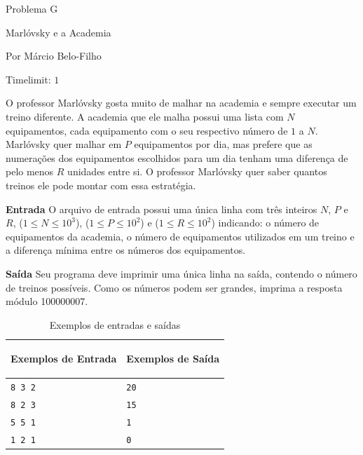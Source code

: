 \begin{center}
Problema G

Marlóvsky e a Academia

{\tiny Por Márcio Belo-Filho}

Timelimit: $1$	
\end{center}			
			
O professor Marlóvsky gosta muito de malhar na academia e sempre executar um treino diferente. A academia que ele malha possui uma lista com $N$ equipamentos, cada equipamento com o seu respectivo número de $1$ a $N$. Marlóvsky quer malhar em $P$ equipamentos por dia, mas prefere que as numerações dos equipamentos escolhidos para um dia tenham uma diferença de pelo menos $R$ unidades entre si. O professor Marlóvsky quer saber quantos treinos ele pode montar com essa estratégia. 

\vspace{0.3cm}
\textbf{Entrada}
O arquivo de entrada possui uma única linha com três inteiros $N$, $P$ e $R$, ($1 \leq N \leq 10^{3}$), ($1 \leq P \leq 10^{2}$) e ($1 \leq R \leq 10^{2}$) indicando: o número de equipamentos da academia, o número de equipamentos utilizados em um treino e a diferença mínima entre os números dos equipamentos. 

\vspace{0.3cm}
\textbf{Saída}
Seu programa deve imprimir uma única linha na saída, contendo o número de treinos possíveis. Como os números podem ser grandes, imprima a resposta módulo 100000007.

\begin{table}[h]
    \centering
    \begin{tabular}{|p{7cm}|p{7cm}|}
        \hline
        \begin{center}
            \vspace{-0.3cm}
            \textbf{Exemplos de Entrada}
            \vspace{-0.3cm}
        \end{center} 
         &  
        \begin{center}
            \vspace{-0.3cm}
            \textbf{Exemplos de Saída}
            \vspace{-0.3cm}
        \end{center} \\ \hline
         \texttt{8 3 2} & \texttt{20} \\ \hline
         \texttt{8 2 3} & \texttt{15} \\ \hline
         \texttt{5 5 1} & \texttt{1} \\ \hline
         \texttt{1 2 1} & \texttt{0} \\ \hline
    \end{tabular}
    \caption{Exemplos de entradas e saídas}
    \label{tab:inputG}
\end{table}

\newpage

\begin{center}
\noindent

\end{center}